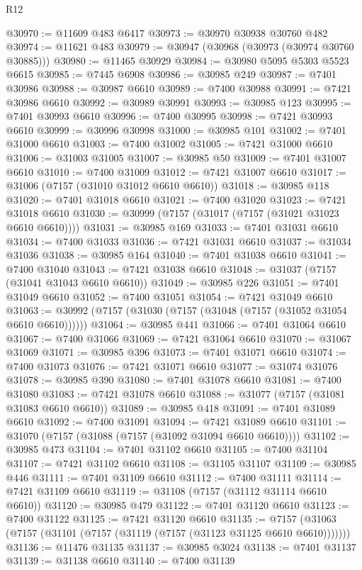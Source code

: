 \begin{lexlean}{R12}
\begin{coremodule}
@30970 := @11609 @483 @6417
@30973 := @30970 @30938 @30760 @482
@30974 := @11621 @483
@30979 := @30947 (@30968 (@30973 (@30974 @30760 @30885)))
@30980 := @11465 @30929
@30984 := @30980 @5095 @5303 @5523 @6615
@30985 := @7445 @6908
@30986 := @30985 @249
@30987 := @7401 @30986
@30988 := @30987 @6610
@30989 := @7400 @30988
@30991 := @7421 @30986 @6610
@30992 := @30989 @30991
@30993 := @30985 @123
@30995 := @7401 @30993 @6610
@30996 := @7400 @30995
@30998 := @7421 @30993 @6610
@30999 := @30996 @30998
@31000 := @30985 @101
@31002 := @7401 @31000 @6610
@31003 := @7400 @31002
@31005 := @7421 @31000 @6610
@31006 := @31003 @31005
@31007 := @30985 @50
@31009 := @7401 @31007 @6610
@31010 := @7400 @31009
@31012 := @7421 @31007 @6610
@31017 := @31006 (@7157 (@31010 @31012 @6610 @6610))
@31018 := @30985 @118
@31020 := @7401 @31018 @6610
@31021 := @7400 @31020
@31023 := @7421 @31018 @6610
@31030 := @30999 (@7157 (@31017 (@7157 (@31021 @31023 @6610 @6610))))
@31031 := @30985 @169
@31033 := @7401 @31031 @6610
@31034 := @7400 @31033
@31036 := @7421 @31031 @6610
@31037 := @31034 @31036
@31038 := @30985 @164
@31040 := @7401 @31038 @6610
@31041 := @7400 @31040
@31043 := @7421 @31038 @6610
@31048 := @31037 (@7157 (@31041 @31043 @6610 @6610))
@31049 := @30985 @226
@31051 := @7401 @31049 @6610
@31052 := @7400 @31051
@31054 := @7421 @31049 @6610
@31063 := @30992 (@7157 (@31030 (@7157 (@31048 (@7157 (@31052 @31054 @6610 @6610))))))
@31064 := @30985 @441
@31066 := @7401 @31064 @6610
@31067 := @7400 @31066
@31069 := @7421 @31064 @6610
@31070 := @31067 @31069
@31071 := @30985 @396
@31073 := @7401 @31071 @6610
@31074 := @7400 @31073
@31076 := @7421 @31071 @6610
@31077 := @31074 @31076
@31078 := @30985 @390
@31080 := @7401 @31078 @6610
@31081 := @7400 @31080
@31083 := @7421 @31078 @6610
@31088 := @31077 (@7157 (@31081 @31083 @6610 @6610))
@31089 := @30985 @418
@31091 := @7401 @31089 @6610
@31092 := @7400 @31091
@31094 := @7421 @31089 @6610
@31101 := @31070 (@7157 (@31088 (@7157 (@31092 @31094 @6610 @6610))))
@31102 := @30985 @473
@31104 := @7401 @31102 @6610
@31105 := @7400 @31104
@31107 := @7421 @31102 @6610
@31108 := @31105 @31107
@31109 := @30985 @446
@31111 := @7401 @31109 @6610
@31112 := @7400 @31111
@31114 := @7421 @31109 @6610
@31119 := @31108 (@7157 (@31112 @31114 @6610 @6610))
@31120 := @30985 @479
@31122 := @7401 @31120 @6610
@31123 := @7400 @31122
@31125 := @7421 @31120 @6610
@31135 := @7157 (@31063 (@7157 (@31101 (@7157 (@31119 (@7157 (@31123 @31125 @6610 @6610)))))))
@31136 := @11476 @31135
@31137 := @30985 @3024
@31138 := @7401 @31137
@31139 := @31138 @6610
@31140 := @7400 @31139

\end{coremodule}
\end{lexlean}
